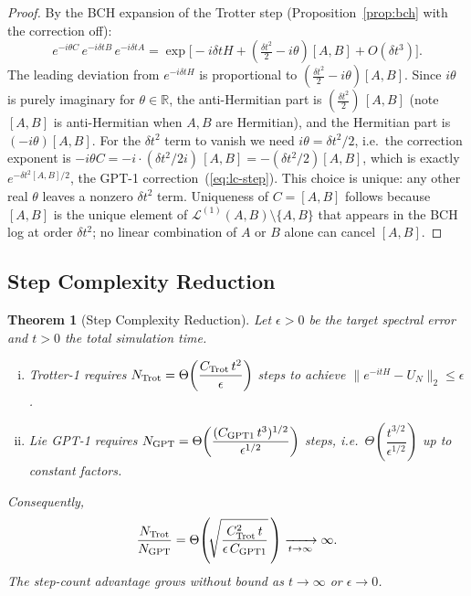 \documentclass[aps,prxquantum,twocolumn,nofootinbib]{revtex4-2}
\newtheorem{theorem}{Theorem}
\begin{document}
\begin{proof}
  By the BCH expansion of the Trotter step
  (Proposition~\ref{prop:bch} with the correction off):
  \begin{equation}
    e^{-i\theta C}\,e^{-i\delta t B}\,e^{-i\delta t A}
    = \exp\!\bigl[-i\delta t H
      + (\tfrac{\delta t^2}{2} - i\theta)[A,B]
      + O(\delta t^3)\bigr].
    \label{eq:opt-log}
  \end{equation}
  The leading deviation from $e^{-i\delta t H}$ is proportional to
  $(\tfrac{\delta t^2}{2}-i\theta)[A,B]$. Since $i\theta$ is purely
  imaginary for $\theta\in\mathbb{R}$, the anti-Hermitian part is
  $(\tfrac{\delta t^2}{2})\,[A,B]$ (note $[A,B]$ is anti-Hermitian
  when $A,B$ are Hermitian), and the Hermitian part is
  $(-i\theta)[A,B]$.
  For the $\delta t^2$ term to vanish we need $i\theta = \delta t^2/2$,
  i.e.\ the correction exponent is $-i\theta C = -i\cdot(\delta t^2/2i)\,[A,B]
  = -(\delta t^2/2)[A,B]$, which is exactly
  $e^{-\delta t^2[A,B]/2}$, the GPT-1 correction~(\ref{eq:lc-step}).
  This choice is unique: any other real $\theta$ leaves a nonzero
  $\delta t^2$ term.
  Uniqueness of $C=[A,B]$ follows because $[A,B]$ is the unique
  element of $\mathcal{L}^{(1)}(A,B)\setminus\{A,B\}$ that appears
  in the BCH log at order $\delta t^2$; no linear combination of $A$
  or $B$ alone can cancel $[A,B]$.
\end{proof}

\subsection{Step Complexity Reduction}
\label{sec:complexity}

\begin{theorem}[Step Complexity Reduction]
  \label{thm:complexity}
  Let $\epsilon>0$ be the target spectral error and $t>0$ the total
  simulation time.
  \begin{enumerate}[(i)]
    \item Trotter-1 requires
      $N_{\rm Trot} = \Theta\!\left(\dfrac{C_{\rm Trot}\,t^2}{\epsilon}\right)$
      steps to achieve $\|e^{-itH}-U_N\|_2\leq\epsilon$.
    \item Lie GPT-1 requires
      $N_{\rm GPT} = \Theta\!\left(\dfrac{(C_{\rm GPT1}\,t^3)^{1/2}}{\epsilon^{1/2}}\right)$
      steps, i.e.\ $\Theta\!\left(\dfrac{t^{3/2}}{\epsilon^{1/2}}\right)$ up to
      constant factors.
  \end{enumerate}
  Consequently,
  \begin{equation}
    \frac{N_{\rm Trot}}{N_{\rm GPT}}
    = \Theta\!\left(\!\sqrt{\frac{C_{\rm Trot}^2\,t}{\epsilon\,C_{\rm GPT1}}}\,\right)
    \xrightarrow[t\to\infty]{} \infty.
    \label{eq:complexity-ratio}
  \end{equation}
  The step-count advantage grows without bound as $t\to\infty$
  or $\epsilon\to 0$.
\end{theorem}
\end{document}
